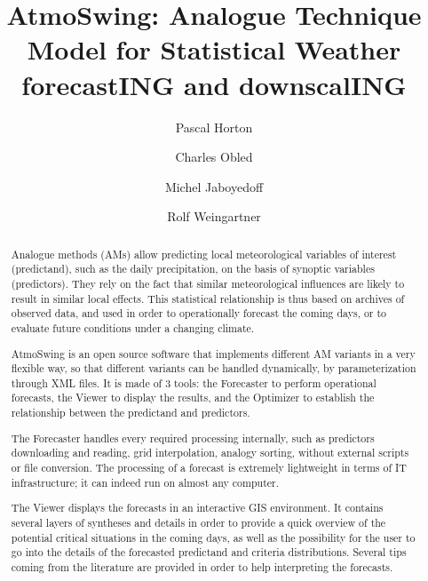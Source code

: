 \documentclass[review]{elsarticle}
\begin{document}
\begin{frontmatter}

\title{AtmoSwing: Analogue Technique Model for Statistical Weather forecastING and downscalING}


\author[unibe,unil,terranum]{Pascal Horton}

\author[grenoble]{Charles Obled}
\author[unil]{Michel Jaboyedoff}
\author[unibe]{Rolf Weingartner}

\address[unibe]{University of Bern, Oeschger Centre for Climate Change Research, Institute of Geography, Bern, Switzerland}
\address[unil]{University of Lausanne, Institute of Earth Sciences, Lausanne, Switzerland}
\address[terranum]{Terranum SARL, Bussigny, Switzerland}
\address[grenoble]{Universit\'{e} de Grenoble-Alpes, LTHE, Grenoble, France}



\begin{abstract}
Analogue methods (AMs) allow predicting local meteorological variables of interest (predictand), such as the daily precipitation, on the basis of synoptic variables (predictors). They rely on the fact that similar meteorological influences are likely to result in similar local effects. This statistical relationship is thus based on archives of observed data, and used in order to operationally forecast the coming days, or to evaluate future conditions under a changing climate.

AtmoSwing is an open source software that implements different AM variants in a very flexible way, so that different variants can be handled dynamically, by parameterization through XML files. It is made of 3 tools: the Forecaster to perform operational forecasts, the Viewer to display the results, and the Optimizer to establish the relationship between the predictand and predictors. 

The Forecaster handles every required processing internally, such as predictors downloading and reading, grid interpolation, analogy sorting, without external scripts or file conversion. The processing of a forecast is extremely lightweight in terms of IT infrastructure; it can indeed run on almost any computer.

The Viewer displays the forecasts in an interactive GIS environment. It contains several layers of syntheses and details in order to provide a quick overview of the potential critical situations in the coming days, as well as the possibility for the user to go into the details of the forecasted predictand and criteria distributions. Several tips coming from the literature are provided in order to help interpreting the forecasts.


\end{abstract}
\end{frontmatter}
\end{document}
